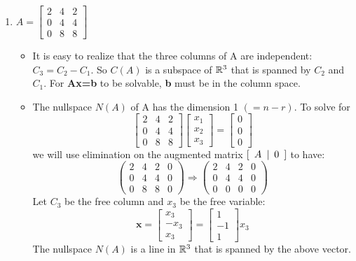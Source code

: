 \begin{enumerate}[label={(\arabic*)}]
    \item  \(A = \begin{bmatrix} 2 & 4 & 2 \\ 0 & 4 & 4 \\ 0 & 8 & 8 \end{bmatrix}\)
    \begin{itemize}
        \item It is easy to realize that the three columns of A are independent: \(C_3 = C_2 - C_1\). So \(C(A)\) is a subspace of \(\mathbb{R}^3\) that is spanned by \(C_2\) and \(C_1\). For \textbf{Ax=b} to be solvable, \textbf{b} must be in the column space. 
        \item The nullspace \(N(A)\) of A has the dimension 1 \((=n-r)\). To solve for 
        \[\begin{bmatrix} 2 & 4 & 2 \\ 0 & 4 & 4 \\ 0 & 8 & 8 \end{bmatrix} \begin{bmatrix} x_1 \\ x_2 \\ x_3  \end{bmatrix} = \begin{bmatrix} 0 \\ 0 \\ 0 \end{bmatrix}\]
        we will use elimination on the augmented matrix  \([\hspace{0.5em} A \hspace{0.5em} |\hspace{0.5em} 0 \hspace{0.5em}]\)  to have:
        \[\left(\begin{array}{ccc|c}  2 & 4 & 2 & 0 \\ 0 & 4 & 4 & 0 \\ 0 & 8 & 8 & 0 \end{array}\right) \Longrightarrow \left(\begin{array}{ccc|c}  2 & 4 & 2 & 0 \\ 0 & 4 & 4 & 0 \\ 0 & 0 & 0 & 0\end{array}\right) \]
        Let \(C_3\) be the free column and \(x_3\) be the free variable: \[\textbf{x} = \begin{bmatrix} x_3 \\ -x_3 \\ x_3 \end{bmatrix} = \begin{bmatrix} 1 \\ -1 \\ 1 \end{bmatrix}x_3\]
        The nullspace \(N(A)\) is a line in \(\mathbb{R}^3\) that is spanned by the above vector. 
    \end{itemize}
    
\end{enumerate}

